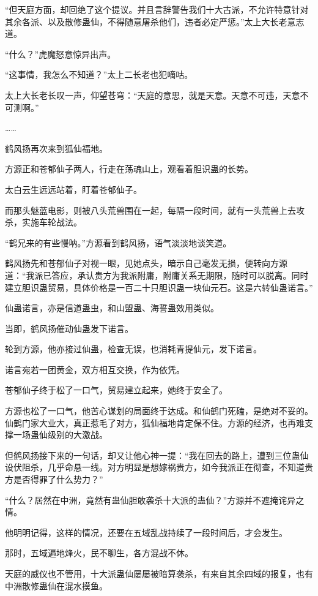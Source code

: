 \begin{this_body}
“但天庭方面，却回绝了这个提议。并且言辞警告我们十大古派，不允许特意针对其余各派、以及散修蛊仙，不得随意屠杀他们，违者必定严惩。”太上大长老意志道。

“什么？”虎魔怒意惊异出声。

“这事情，我怎么不知道？”太上二长老也犯嘀咕。

太上大长老长叹一声，仰望苍穹：“天庭的意思，就是天意。天意不可违，天意不可测啊。”

……

鹤风扬再次来到狐仙福地。

方源正和苍郁仙子两人，行走在荡魂山上，观看着胆识蛊的长势。

太白云生远远站着，盯着苍郁仙子。

而那头魅蓝电影，则被八头荒兽围在一起，每隔一段时间，就有一头荒兽上去攻杀，实施车轮战法。

“鹤兄来的有些慢呐。”方源看到鹤风扬，语气淡淡地谈笑道。

鹤风扬先和苍郁仙子对视一眼，见她点头，暗示自己毫发无损，便转向方源道：“我派已答应，承认贵方为我派附庸，附庸关系无期限，随时可以脱离。同时建立胆识蛊贸易，具体价格是一百二十只胆识蛊一块仙元石。这是六转仙蛊诺言。”

仙蛊诺言，亦是信道蛊虫，和山盟蛊、海誓蛊效用类似。

当即，鹤风扬催动仙蛊发下诺言。

轮到方源，他亦接过仙蛊，检查无误，也消耗青提仙元，发下诺言。

诺言宛若一团黄金，双方相互交换，作为依凭。

苍郁仙子终于松了一口气，贸易建立起来，她终于安全了。

方源也松了一口气，他苦心谋划的局面终于达成。和仙鹤门死磕，是绝对不妥的。仙鹤门家大业大，真正惹毛了对方，狐仙福地肯定保不住。方源的经济，也再难支撑一场蛊仙级别的大激战。

但鹤风扬接下来的一句话，却又让他心神一提：“我在回去的路上，遭到三位蛊仙设伏阻杀，几乎命悬一线。对方明显是想嫁祸贵方，如今我派正在彻查，不知道贵方是否得罪了什么势力？”

“什么？居然在中洲，竟然有蛊仙胆敢袭杀十大派的蛊仙？”方源并不遮掩诧异之情。

他明明记得，这样的情况，还要在五域乱战持续了一段时间后，才会发生。

那时，五域遍地烽火，民不聊生，各方混战不休。

天庭的威仪也不管用，十大派蛊仙屡屡被暗算袭杀，有来自其余四域的报复，也有中洲散修蛊仙在混水摸鱼。


\end{this_body}
